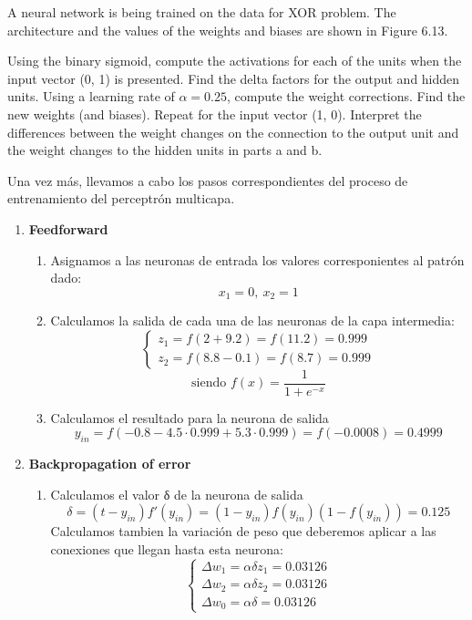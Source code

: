 \begin{problem}[6]
A neural network is being trained on the data for XOR problem. The architecture and the values of the weights and biases are shown in Figure 6.13.

\ppart Using the binary sigmoid, compute the activations for each of the units when the input vector (0, 1) is presented. Find the delta factors for the output and hidden units. Using a learning rate of $α = 0.25$, compute the weight corrections. Find the new weights (and biases).
\ppart Repeat for the input vector (1, 0).
\ppart Interpret the differences between the weight changes on the connection to the output unit and the weight changes to the hidden units in parts a and b.
\solution

\spart

Una vez más, llevamos a cabo los pasos correspondientes del proceso de entrenamiento del perceptrón multicapa.

\begin{enumerate}
\item \textbf{Feedforward}
\begin{enumerate}
\item Asignamos a las neuronas de entrada los valores corresponientes al patrón dado:
\[x_1 = 0, \ x_2 = 1\]
\item Calculamos la salida de cada una de las neuronas de la capa intermedia:
\[\left\{ \begin{array}{l}
z_1 = f(2+9.2) = f(11.2) = 0.999\\
z_2 = f(8.8-0.1) =f(8.7) = 0.999
\end{array}\right.\]
\[\text{siendo }f(x) = \frac{1}{1+e^{-x}}\]

\item Calculamos el resultado para la neurona de salida
\[y_{in} = f(-0.8-4.5\cdot 0.999 + 5.3 \cdot 0.999)=f(-0.0008) = 0.4999\]
\end{enumerate}
\item \textbf{Backpropagation of error}
\begin{enumerate}
\item Calculamos el valor δ de la neurona de salida
\[δ = (t-y_{in})f'(y_{in}) = (1-y_{in})f(y_{in})(1-f(y_{in})) = 0.125\]
Calculamos tambien la variación de peso que deberemos aplicar a las conexiones que llegan hasta esta neurona:
\[\left\{ \begin{array}{l}
Δw_1= αδz_1 = 0.03126 \\
Δw_2= αδz_2 = 0.03126 \\
Δw_0= αδ = 0.03126
\end{array}\right.\]


\end{enumerate}
\end{enumerate}
\end{problem}
